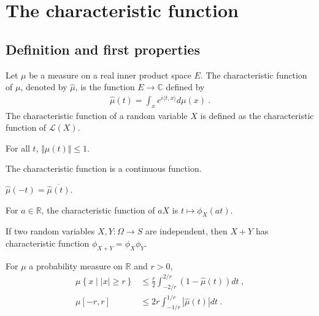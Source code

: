 \chapter{The characteristic function}

\section{Definition and first properties}

\begin{definition}\label{def:charFun}
Let $\mu$ be a measure on a real inner product space $E$. The characteristic function of $\mu$, denoted by $\hat{\mu}$, is the function $E \to \mathbb{C}$ defined by
\begin{align*}
\hat{\mu}(t) = \int_x e^{i \langle t, x \rangle} d\mu(x) \: .
\end{align*}
The characteristic function of a random variable $X$ is defined as the characteristic function of $\mathcal L(X)$.
\end{definition}

\begin{lemma}\label{lem:charFun_bounded}
For all $t$, $\Vert\hat{\mu}(t)\Vert \le 1$.
\end{lemma}

\begin{lemma}\label{lem:charFun_continuous}
The characteristic function is a continuous function.
\end{lemma}

\begin{lemma}\label{lem:charFun_neg}
$\hat{\mu}(-t) = \overline{\hat{\mu}(t)}$.
\end{lemma}

\begin{lemma}\label{lem:charFun_smul}
For $a \in \mathbb{R}$, the characteristic function of $a X$ is $t \mapsto \phi_X(at)$.
\end{lemma}

\begin{lemma}\label{lem:charFun_add_of_indep}
If two random variables $X, Y : \Omega \to S$ are independent, then $X+Y$ has characteristic function $\phi_{X+Y} = \phi_X \phi_Y$. 
\end{lemma}

\begin{lemma}\label{lem:charFun_bound}
For $\mu$ a probability measure on $\mathbb{R}$ and $r > 0$,
\begin{align*}
\mu \left\{x \mid |x| \ge r\right\}
&\le \frac{r}{2} \int_{-2/r}^{2/r} (1 - \hat{\mu}(t))dt
\: , \\
\mu [-r, r]
&\le 2 r \int_{-1/r}^{1/r} |\hat{\mu}(t)| dt
\: .
\end{align*}
\end{lemma}

